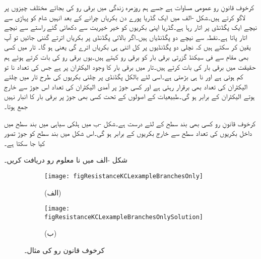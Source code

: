 کرخوف قانونِ رو عمومی مساوات ہے جسے ہم روزمرہ  زندگی میں برقی رو کی بجائے مختلف چیزوں پر لاگو کرتے ہیں۔شکل -الف میں ایک گڈریا پورے دن  بکریاں چرانے کے بعد انہیں شام کو  پہاڑی سے نیچے ایک پگڈنڈی پر اتار رہا ہے۔گڈریا اپنی بکریوں کو خیر خیریت سے دکھائی گئے راستے سے نیچے اتار پاتا ہے۔نقطہ  سے نیچے دو پگڈنڈیاں ہیں۔اگر بالائی پگڈنڈی پر  بکریاں اترتے گننی جائیں تو آپ یقین کر سکتے ہیں کہ نچلی دو پگڈنڈیوں پر کل اتنی ہی بکریاں اترے گی یعنی  ہو گا۔ تار میں کسی بھی مقام سے فی سیکنڈ گزرتی برقی بار کو برقی رو کہتے ہیں۔یوں برقی رو کی بات کرتے ہوئے ہم حقیقت میں برقی بار کی بات کرتے ہیں۔تار میں برقی بار کا وجود الیکٹران پر ہے جس کی تعداد نا تو کم ہوتی ہے اور نا ہی بڑھتی ہے۔اسی لئے بالکل پگڈنڈی پر چلتی بکریوں کی طرح تار میں چلتے الیکٹران کی تعداد بھی برقرار رہتی ہے اور کسی جوڑ پر آمدی الیکٹران کی تعداد اس جوڑ سے خارج ہوتے الیکٹران کے برابر ہو گی۔طبیعیات کے اصولوں کے تحت کسی بھی جوڑ پر برقی بار کا انبار نہیں جمع ہوتا۔ 

کرخوف قانونِ رو  کسی بھی بند سطح کے لئے درست ہے۔شکل -ب میں ہلکی سیاہی میں بند سطح میں داخل بکریوں کی تعداد سطح سے خارج بکریوں کے برابر ہو گی۔اس شکل میں بند سطح کو جوڑ  تصور کیا جا سکتا ہے۔

\FloatBarrier
{}
شکل -الف میں نا معلوم رو دریافت کریں۔ 

\begin{figure}
\centering
\begin{subfigure}{0.5\textwidth}
\centering
\texttt{[image: figResistanceKCLexampleBranchesOnly]}
\caption*{(الف)}
\end{subfigure}%
%
\begin{subfigure}{0.5\textwidth}
\centering
\texttt{[image: figResistanceKCLexampleBranchesOnlySolution]}
\caption*{(ب)}
\end{subfigure}%
\caption{کرخوف قانون رو کی مثال۔}
\label{شکل_مزاحمتی_کرخوف_قانون_رو_مثال}
\end{figure}

